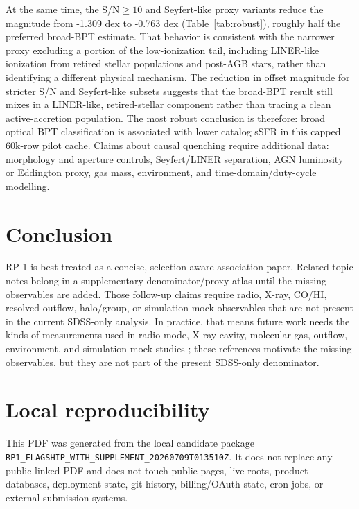 \documentclass[twocolumn]{aastex631}
\begin{document}
At the same time, the S/N$\geq10$ and Seyfert-like proxy variants reduce the magnitude from -1.309 dex to -0.763 dex (Table~\ref{tab:robust}), roughly half the preferred broad-BPT estimate. That behavior is consistent with the narrower proxy excluding a portion of the low-ionization tail, including LINER-like ionization from retired stellar populations and post-AGB stars, rather than identifying a different physical mechanism. The reduction in offset magnitude for stricter S/N and Seyfert-like subsets suggests that the broad-BPT result still mixes in a LINER-like, retired-stellar component rather than tracing a clean active-accretion population. The most robust conclusion is therefore: broad optical BPT classification is associated with lower catalog sSFR in this capped 60k-row pilot cache. Claims about causal quenching require additional data: morphology and aperture controls, Seyfert/LINER separation, AGN luminosity or Eddington proxy, gas mass, environment, and time-domain/duty-cycle modelling.

\section{Conclusion}
RP-1 is best treated as a concise, selection-aware association paper. Related topic notes belong in a supplementary denominator/proxy atlas until the missing observables are added. Those follow-up claims require radio, X-ray, CO/HI, resolved outflow, halo/group, or simulation-mock observables that are not present in the current SDSS-only analysis.
In practice, that means future work needs the kinds of measurements used in radio-mode, X-ray cavity, molecular-gas, outflow, environment, and simulation-mock studies \citep{best2005,dekel2006,fabian2012,heckmanbest2014,lamassa2013,mcnamara2007,veilleux2005,xcoldgass2017,xgass2018,cicone2014,carniani2017,fiore2017,simba2019,tng2019,eagle2015,peng2010,piotrowska2022,wetzel2013}; these references motivate the missing observables, but they are not part of the present SDSS-only denominator.

\section{Local reproducibility}
This PDF was generated from the local candidate package \texttt{RP1\_FLAGSHIP\_WITH\_SUPPLEMENT\_20260709T013510Z}. It does not replace any public-linked PDF and does not touch public pages, live roots, product databases, deployment state, git history, billing/OAuth state, cron jobs, or external submission systems.
\end{document}
